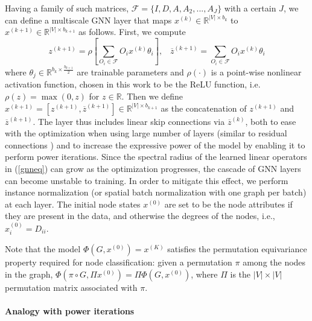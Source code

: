 \documentclass{article} \usepackage{iclr2019_conference,times}
\newcommand{\R}{\mathbb{R}}
\begin{document}
Having a family of such matrices, $\mathcal{F} = \{I, D, A, A_{2}, ..., A_{J} \}$ with a certain $J$,
we can define a multiscale GNN layer that maps $x^{(k)} \in \R^{|V| \times b_k}$ 
to $x^{(k+1)} \in \R^{|V| \times b_{k+1}}$ as follows. First, we compute
\begin{equation}
\label{gnneq}
{z^{(k+1)}} = \rho \left[ \sum_{O_i \in \mathcal{F}} O_i x^{(k)} \theta_i \right], \hspace{10pt}
{\overline{z}^{(k+1)}} = \sum_{O_i \in \mathcal{F}} O_i x^{(k)} \theta_i
\end{equation}
where $\theta_j \in \mathbb{R}^{b_k \times \frac{b_{k+1}}{2}}$ are trainable parameters and $\rho(\cdot)$ is a point-wise nonlinear activation function, chosen in this work to be the ReLU function, i.e. $\rho(z) = \max(0,z)$ for $z \in \mathbb{R}$. Then we define $ x^{(k+1)} = [z^{(k+1)}, \overline{z}^{(k+1)}] \in  \mathbb{R}^{|V| \times b_{k+1}}$
as the concatenation of $z^{(k+1)}$ and $\overline{z}^{(k+1)}$.
The layer thus includes linear skip connections via $\overline{z}^{(k)}$, both to ease with the optimization when using large number of layers (similar to residual connections \citep{he2016deep}) and to increase the expressive power of the model by enabling it to perform power iterations. Since the spectral radius of the learned linear operators in (\ref{gnneq}) can grow as the optimization progresses, the cascade of GNN layers can become unstable to training. 
In order to mitigate this effect, we perform instance normalization (or spatial batch normalization with one graph per batch) \citep{ioffe2015batch, ulyanov2016instance} at each layer.
The initial node states $x^{(0)}$ are set to be the node attributes if they are present in the data, and otherwise the degrees of the nodes, i.e., $x^{(0)}_i = D_{ii}$. 

Note that the model $\Phi(G, x^{(0)})=x^{(K)}$ satisfies the permutation equivariance property required 
for node classification: given a permutation $\pi$ among the nodes in the graph, $\Phi(\pi \circ G, \Pi x^{(0)}) = \Pi \Phi(G, x^{(0)})$, where $\Pi$ is the $|V| \times |V|$ permutation matrix associated with $\pi$. 

\paragraph{Analogy with power iterations}
\end{document}
